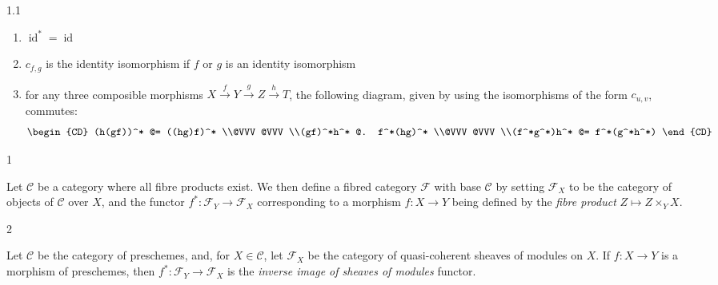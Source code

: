 \begin{definition}{1.1}
\begin{enumerate}
 \item[i.]
        \(\operatorname {id}^*=\operatorname {id}\)
      


      
 \item[ii.]
        \(c_{f,g}\) is the identity isomorphism if \(f\) or \(g\) is an identity isomorphism
      


      
 \item[iii.]
        for any three composible morphisms \(X\xrightarrow {f}Y\xrightarrow {g}Z\xrightarrow {h}T\), the following diagram, given by using the isomorphisms of the form \(c_{u,v}\), commutes:
        \[           \begin {CD}             (h(gf))^* @= ((hg)f)^*           \\@VVV @VVV           \\(gf)^*h^* @. f^*(hg)^*           \\@VVV @VVV           \\(f^*g^*)h^* @= f^*(g^*h^*)           \end {CD}         \]
      

    \end{enumerate}\end{definition}\begin{example}{1}\label{fga3.i-a.1-example-1}\skipsinglepar\par{}Let \(\mathcal {C}\) be a category where all fibre products exist.
    We then define a fibred category \(\mathcal {F}\) with base \(\mathcal {C}\) by setting \(\mathcal {F}_X\) to be the category of objects of \(\mathcal {C}\) over \(X\), and the functor \(f^*\colon \mathcal {F}_Y\to \mathcal {F}_X\) corresponding to a morphism \(f\colon  X\to  Y\) being defined by the \emph{fibre product} \(Z\mapsto  Z\times _Y X\).\end{example}\begin{example}{2}\label{fga3.i-a.1-example-2}\skipsinglepar\par{}Let \(\mathcal {C}\) be the category of preschemes, and, for \(X\in \mathcal {C}\), let \(\mathcal {F}_X\) be the category of quasi-coherent sheaves of modules on \(X\).
    If \(f\colon  X\to  Y\) is a morphism of preschemes, then \(f^*\colon \mathcal {F}_Y\to \mathcal {F}_X\) is the \emph{inverse image of sheaves of modules} functor.
    

\end{example}
